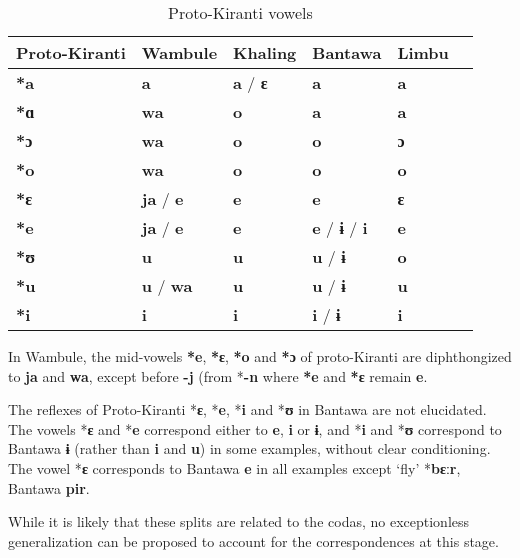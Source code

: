 \documentclass[oneside,a4paper,11pt]{article}
\newcommand{\ipa}[1]{\textbf{{\phon\mbox{#1}}}} %
\begin{document}
\begin{table}[H]
\caption{Proto-Kiranti vowels} \centering \label{tab:vowels}
\begin{tabular}{llllll}
\toprule
Proto-Kiranti & Wambule & Khaling & Bantawa & Limbu \\
\midrule
\ipa{*a} & \ipa{a} & \ipa{a}  / \ipa{ɛ} & \ipa{a} & \ipa{a}  \\
\ipa{*ɑ} & \ipa{wa} & \ipa{o} & \ipa{a} & \ipa{a}  \\
\ipa{*ɔ} & \ipa{wa} & \ipa{o} & \ipa{o} & \ipa{ɔ}  \\
\ipa{*o} & \ipa{wa} & \ipa{o} & \ipa{o} & \ipa{o}  \\
\ipa{*ɛ} & \ipa{ja} /  \ipa{e} & \ipa{e} & \ipa{e}  & \ipa{ɛ}  \\
\ipa{*e} & \ipa{ja} /  \ipa{e}  & \ipa{e} & \ipa{e}  / \ipa{ɨ} / \ipa{i} & \ipa{e}    \\
\ipa{*ʊ} & \ipa{u} & \ipa{u} & \ipa{u}  /  \ipa{ɨ}  & \ipa{o} \\
\ipa{*u} & \ipa{u} / \ipa{wa} & \ipa{u} & \ipa{u} /  \ipa{ɨ} \  & \ipa{u} \\
\ipa{*i} & \ipa{i} & \ipa{i} & \ipa{i}  / \ipa{ɨ} & \ipa{i}  \\
\bottomrule
\end{tabular}
\end{table}

In Wambule, the mid-vowels \ipa{*e}, \ipa{*ɛ}, \ipa{*o} and \ipa{*ɔ} of proto-Kiranti are diphthongized to \ipa{ja} and \ipa{wa}, except before \ipa{-j} (from *\ipa{-n} where \ipa{*e} and \ipa{*ɛ} remain \ipa{e}. 

The reflexes of Proto-Kiranti *\ipa{ɛ}, *\ipa{e}, *\ipa{i} and *\ipa{ʊ} in Bantawa are not elucidated. The vowels *\ipa{ɛ} and *\ipa{e} correspond either to \ipa{e}, \ipa{i} or \ipa{ɨ}, and *\ipa{i} and *\ipa{ʊ} correspond to Bantawa \ipa{ɨ} (rather than \ipa{i} and \ipa{u}) in some examples, without clear conditioning. The vowel *\ipa{ɛ} corresponds to Bantawa \ipa{e} in all examples except `fly' *\ipa{bɛːr}, Bantawa \ipa{pir}.

While it is likely that these splits are related to the codas, no exceptionless generalization can be proposed to account for the correspondences at this stage.
 
\end{document}
